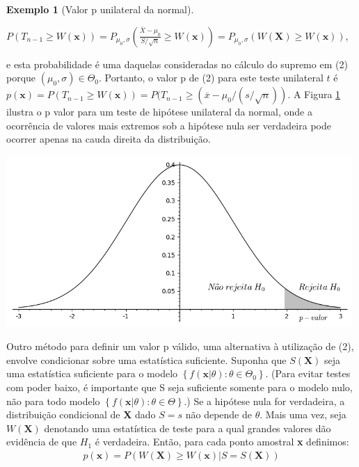\documentclass[10pt]{article}
\theoremstyle{plain}
\theoremstyle{remark}
\theoremstyle{definition}
\newtheorem{exe}[teor]{Exemplo}
\begin{document}
\begin{framed}
\begin{exe}[Valor p unilateral da normal]
\begin{center}
    $P(T_{n-1} \geq W(\textbf{x}))=P_{\mu_{0},\sigma}\left(\frac{\overline{X}-\mu_{0}}{S/\sqrt{n}} \geq W(\textbf{x})\right)=P_{\mu_{0},\sigma}(W(\textbf{X}) \geq W(\textbf{x}))$,
\end{center}
e esta probabilidade é uma daquelas consideradas no cálculo do supremo em (2) porque $(\mu_{0},\sigma) \in \Theta_{0}$. Portanto, o valor p de (2) para este teste unilateral $t$ é $p(\textbf{x})=P(T_{n-1} \geq W(\textbf{x}))=P(T_{n-1} \geq (\overline{x}-\mu_{0}/(s/\sqrt{n}))$.
A Figura \ref{fig:unilateral} ilustra o p valor para um teste de hipótese unilateral da normal, onde a ocorrência de valores mais extremos sob a hipótese nula ser verdadeira pode ocorrer apenas na cauda direita da distribuição.\vspace{0.25cm} %
\begin{minipage}{\textwidth}
\centering
    \includegraphics[height=6.5cm]{Unilateral.png}
    \label{fig:unilateral}
\end{minipage}
\end{exe}
\end{framed}
Outro método para definir um valor p válido, uma alternativa à utilização de (2), envolve condicionar sobre uma estatística suficiente. Suponha que $S(\textbf{X})$ seja uma estatística suficiente para o modelo $\left\{f(\textbf{x}|\theta): \theta \in \Theta_{0}\right\}$. (Para evitar testes com poder baixo, é importante que S seja suficiente somente para o modelo nulo, não para todo modelo $\left\{f(\textbf{x}|\theta): \theta \in \Theta\right\}$.) Se a hipótese nula for verdadeira, a distribuição condicional de \textbf{X} dado $S=s$ não depende de $\theta$. Mais uma vez, seja $W(\textbf{X})$ denotando uma estatística de teste para a qual grandes valores dão evidência de que $H_{1}$ é verdadeira. Então, para cada ponto amostral \textbf{x} definimos:
\begin{align}
    p(\textbf{x})=P(W(\textbf{X}) \geq W(\textbf{x})|S=S(\textbf{X}))
\end{align}
\end{document}
